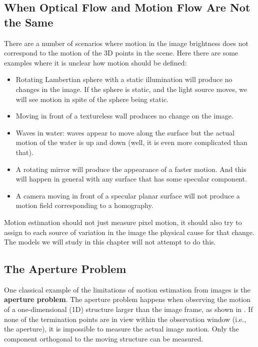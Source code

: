 \subsection{When Optical Flow and Motion Flow Are Not the Same}

There are a number of scenarios where motion in the image brightness does not correspond to the motion of the 3D points in the scene. Here there are some examples where it is unclear how motion should be defined:

\begin{itemize}
\item Rotating Lambertian sphere with a static illumination will produce no changes in the image. If the sphere is static, and the light source moves, we will see motion in spite of the sphere being static.

\item Moving in front of a textureless wall produces no change on the image.

\item Waves in water: waves appear to move along the surface but the actual motion of the water is up and down (well, it is even more complicated than that).

\item A rotating mirror will produce the appearance of a faster motion. And this will happen in general with any surface that has some specular component. 

\item A camera moving in front of a specular planar surface will not produce a motion field corresponding to a homography. 
\end{itemize}

Motion estimation should not just measure pixel motion, it should also try to assign to each source of variation in the image the physical cause for that change. The models we will study in this chapter will not attempt to do this. 

\subsection{The Aperture Problem}

One classical example of the limitations of motion estimation from images is the {\bf aperture problem}.  
The aperture problem happens when observing the motion of a one-dimensional (1D) structure larger than the image frame, as shown in \fig{\ref{fig:apperture_problem}}. If none of the termination points are in view within the observation window (i.e., the aperture), it is impossible to measure the actual image motion. Only the component orthogonal to the moving structure can be measured.  


